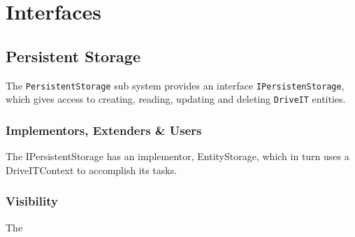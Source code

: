 \section{Interfaces}

\subsection{Persistent Storage}
The \texttt{PersistentStorage} sub system provides an interface \texttt{IPersistenStorage}, which gives access to creating, reading, updating and deleting \texttt{DriveIT} entities. 
\subsubsection{Implementors, Extenders \& Users}
The IPersistentStorage has an implementor, EntityStorage, which in turn uses a DriveITContext to accomplish its tasks. 

\subsubsection{Visibility}
The 